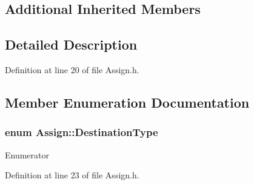 \subsection*{Additional Inherited Members}


\subsection{Detailed Description}


Definition at line 20 of file Assign.\-h.



\subsection{Member Enumeration Documentation}
\hypertarget{class_assign_ae0f42117c12a8d0bc2bf0b7574070694}{
\subsubsection[{Destination\-Type}]{\setlength{\rightskip}{0pt plus 5cm}enum {\bf Assign\-::\-Destination\-Type}\hspace{0.3cm}{\ttfamily [strong]}}}\label{class_assign_ae0f42117c12a8d0bc2bf0b7574070694}
\begin{Desc}
\item[Enumerator]\par
\begin{description}
\item[{\em 
\hypertarget{class_assign_ae0f42117c12a8d0bc2bf0b7574070694af2bbdf9f72c085adc4d0404e370f0f4c}{Attribute}\label{class_assign_ae0f42117c12a8d0bc2bf0b7574070694af2bbdf9f72c085adc4d0404e370f0f4c}
}]\item[{\em 
\hypertarget{class_assign_ae0f42117c12a8d0bc2bf0b7574070694a47c14840d8e15331fa420b9b2f757cd9}{Variable}\label{class_assign_ae0f42117c12a8d0bc2bf0b7574070694a47c14840d8e15331fa420b9b2f757cd9}
}]\end{description}
\end{Desc}


Definition at line 23 of file Assign.\-h.



